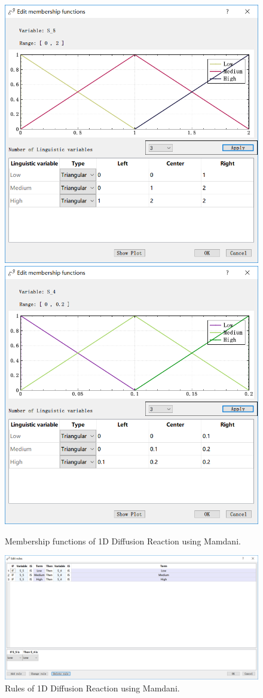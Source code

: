 \documentclass[journal,a4paper,onecolumn]{article}
\begin{document}
\begin{figure}[!hbt]
	\begin{center}
		\includegraphics[width=0.45\columnwidth]{fig31}
		\includegraphics[width=0.45\columnwidth]{fig32}
		\caption{Membership functions of 1D Diffusion Reaction using Mamdani.}
		\label{fig:Membership functions of 1D Diffusion Reaction using Mamdani.}
	\end{center}
\end{figure}
\begin{figure}[!hbt]
	\begin{center}
		\includegraphics[width=\columnwidth]{fig33}
		\caption{Rules of 1D Diffusion Reaction using Mamdani.}
		\label{fig:Rules of 1D Diffusion Reaction using Mamdani.}
	\end{center}
\end{figure}
\end{document}
